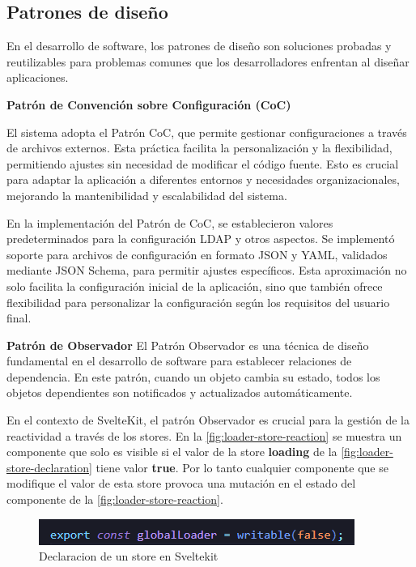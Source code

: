 \subsection{Patrones de diseño}

En el desarrollo de software, los patrones de diseño son soluciones probadas y reutilizables para problemas comunes que los desarrolladores enfrentan al diseñar aplicaciones.

\textbf{Patrón de Convención sobre Configuración (CoC)}

El sistema adopta el Patrón CoC, que permite gestionar configuraciones a través de archivos externos. Esta práctica facilita la personalización y la flexibilidad, permitiendo ajustes sin necesidad de modificar el código fuente. Esto es crucial para adaptar la aplicación a diferentes entornos y necesidades organizacionales, mejorando la mantenibilidad y escalabilidad del sistema.

En la implementación del Patrón de CoC, se establecieron valores predeterminados para la configuración LDAP y otros aspectos. Se implementó soporte para archivos de configuración en formato JSON y YAML, validados mediante JSON Schema, para permitir ajustes específicos. Esta aproximación no solo facilita la configuración inicial de la aplicación, sino que también ofrece flexibilidad para personalizar la configuración según los requisitos del usuario final.

\textbf{Patrón de Observador}
El Patrón Observador es una técnica de diseño fundamental en el desarrollo de software para establecer relaciones de dependencia. En este patrón, cuando un objeto cambia su estado, todos los objetos dependientes son notificados y actualizados automáticamente.

En el contexto de SvelteKit, el patrón Observador es crucial para la gestión de la reactividad a través de los stores. En la \autoref{fig:loader-store-reaction} se muestra un componente que solo es visible si el valor de la store \textbf{loading} de la \autoref{fig:loader-store-declaration} tiene valor \textbf{true}. Por lo tanto cualquier componente que se modifique el valor de esta store provoca una mutación en el estado del componente de la \autoref{fig:loader-store-reaction}.

\begin{figure}[H]
    \centering
    \includegraphics[width=\linewidth]{images/code/loader-store-declaration.png}
    \caption{Declaracion de un store en Sveltekit}
    \label{fig:loader-store-declaration}
\end{figure}

